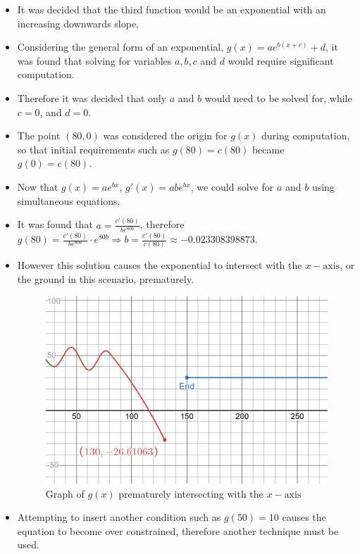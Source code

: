 \documentclass[11pt, letterpaper]{article}
\begin{document}
\begin{itemize}
	\item It was decided that the third function would be an exponential with an increasing downwards slope.
	\item Considering the general form of an exponential, $g(x)=ae^{b(x+c)}+d$, it was found that solving for variables $a, b, c$ and $d$ would require significant computation.
	\item Therefore it was decided that only $a$ and $b$ would need to be solved for, while $c=0$, and $d=0$.
	\item The point $(80, 0)$ was considered the origin for $g(x)$ during computation, so that  initial requirements such as $g(80)=c(80)$ became $g(0)=c(80)$. 
	\item Now that $g(x)=ae^{bx}$, $g'(x)=abe^{bx}$, we could solve for $a$ and $b$ using simultaneous equations.
	\item It was found that $a=\frac{c'(80)}{be^{80b}}$, therefore $g(80)=\frac{c'(80)}{be^{80b}}\cdot e^{80b}\Rightarrow b=\frac{c'(80)}{c(80)}\approx -0.023308398873$.
	\item However this solution causes the exponential to intersect with the $x-\textrm{axis}$, or the ground in this scenario, prematurely. 
	\begin{figure}[h]
		\centering
		\includegraphics[width=15cm]{PrematureIntersecion.png}
		\caption{Graph of $g(x)$ prematurely intersecting with the $x-\textrm{axis}$}
	\end{figure}
	\item Attempting to insert another condition such as $g(50)=10$ causes the equation to become over constrained, therefore another technique must be used. 
	

\end{itemize}
\end{document}
